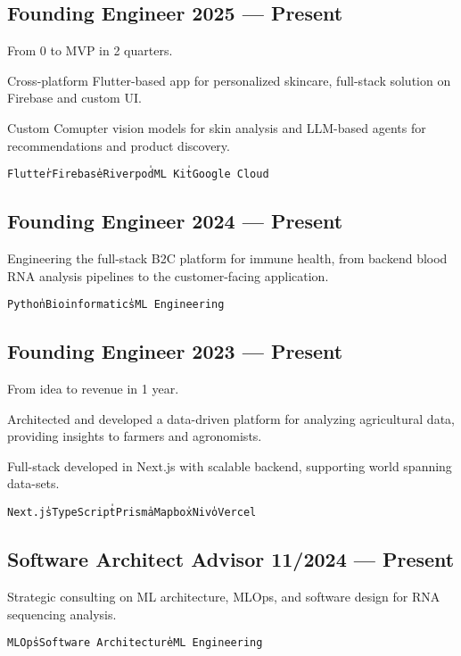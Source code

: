 \documentclass[letter,10pt]{article}
\begin{document}
\subsection{{Founding Engineer \hfill 2025 --- Present}}
\begin{zitemize}
\item From 0 to MVP in 2 quarters.
\item Cross-platform Flutter-based app for personalized skincare, full-stack solution on Firebase and custom UI.
\item Custom Comupter vision models for skin analysis and LLM-based agents for recommendations and product discovery.
\item[] \texttt{Flutter{\|}Firebase{\|}Riverpod{\|}ML Kit{\|}Google Cloud}
\end{zitemize}

\subsection{{Founding Engineer \hfill 2024 --- Present}}
\begin{zitemize}
\item Engineering the full-stack B2C platform for immune health, from backend blood RNA analysis pipelines to the customer-facing application.
\item[] \texttt{Python{\|}Bioinformatics{\|}ML Engineering}
\end{zitemize}

\subsection{{Founding Engineer \hfill 2023 --- Present}}
\begin{zitemize}
\item From idea to revenue in 1 year. 
\item Architected and developed a data-driven platform for analyzing agricultural data, providing insights to farmers and agronomists.
\item Full-stack developed in Next.js with scalable backend, supporting world spanning data-sets. 
\item[] \texttt{Next.js{\|}TypeScript{\|}Prisma{\|}Mapbox{\|}Nivo{\|}Vercel}
\end{zitemize}

\subsection{{Software Architect Advisor \hfill 11/2024 --- Present}}
\begin{zitemize}
\item Strategic consulting on ML architecture, MLOps, and software design for RNA sequencing analysis.
\item[] \texttt{MLOps{\|}Software Architecture{\|}ML Engineering}
\end{zitemize}
\end{document}
